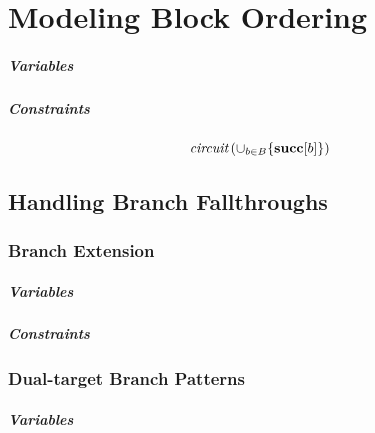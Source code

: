 %

\chapter{Modeling Block Ordering}

\paragraph{Variables}

\paragraph{Constraints}

\begin{equation}
  \mCircuit\left(
    \cup_{b \in \mBlockSet} \{\mVar{succ}[b]\}
  \right)
  \labelEquation{block-order}
\end{equation}




\section{Handling Branch Fallthroughs}

\subsection{Branch Extension}

\paragraph{Variables}

\paragraph{Constraints}

\subsection{Dual-target Branch Patterns}

\paragraph{Variables}

